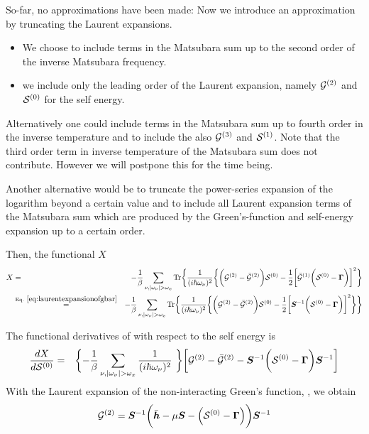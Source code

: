 \documentclass[11pt,a4paper]{report}
\begin{document}
So-far, no approximations have been made: Now we introduce an
approximation by truncating the Laurent expansions.
\begin{itemize}
\item We choose to include terms in the Matsubara sum up to the second
  order of the inverse Matsubara frequency.
\item we include only the leading order of the Laurent expansion, namely
  $\mathcal{\bm{G}}^{(2)}$ and $\mathcal{\bm{S}}^{(0)}$ for the self
  energy.
\end{itemize}

Alternatively one could include terms in the Matsubara sum up to
fourth order in the inverse temperature and to include the also
$\mathcal{\bm{G}}^{(3)}$ and $\mathcal{\bm{S}}^{(1)}$. Note that the
third order term in inverse temperature of the Matsubara sum does not
contribute. However we will postpone this for the time being.

Another alternative would be to truncate the power-series expansion of
the logarithm beyond a certain value and to include all Laurent
expansion terms of the Matsubara sum which are produced by the
Green's-function and self-energy expansion up to a certain order.

Then, the functional $X$
\begin{eqnarray}
 X&=&-\frac{1}{\beta}\sum_{\nu,|\omega_\nu|>\omega_x}\Tr\biggl\lbrace
\frac{1}{(i\hbar\omega_\nu)^2}
\biggl\lbrace
\biggl(
\mathcal{\mat{G}}^{(2)}-\bar{\mathcal{\mat{G}}}^{(2)}
\biggr)
\mathcal{\mat{S}}^{(0)}
-
\frac{1}{2}
\biggl[
\bar{\mathcal{\mat{G}}}^{(1)}
\biggl(\mathcal{\mat{S}}^{(0)}-\mat{\Gamma}\biggr)
\biggr]^2\biggr\rbrace
%
\nonumber\\
&\eqrel{eq:laurentexpansionofgbar}{=}&
-\frac{1}{\beta}\sum_{\nu,|\omega_\nu|>\omega_x}\Tr\biggl\lbrace
\frac{1}{(i\hbar\omega_\nu)^2}
\biggl\lbrace
\biggl(
\mathcal{\mat{G}}^{(2)}-\bar{\mathcal{\mat{G}}}^{(2)}
\biggr)
\mathcal{\mat{S}}^{(0)}
-
\frac{1}{2}
\biggl[
\mat{S}^{-1}
\biggl(\mathcal{\mat{S}}^{(0)}-\mat{\Gamma}\biggr)
\biggr]^2\biggr\rbrace
\biggr\rbrace
\label{eq:161forx}
\end{eqnarray}

The functional derivatives of  with respect to the self
energy is
\begin{eqnarray}
\frac{dX}{d\mathcal{\mat{S}}^{(0)}}
&=&
\biggl\lbrace
-\frac{1}{\beta}\sum_{\nu,|\omega_\nu|>\omega_x}\frac{1}{(i\hbar\omega_\nu)^2}\
\biggr\rbrace
\biggl[
\mathcal{\mat{G}}^{(2)}-\bar{\mathcal{\mat{G}}}^{(2)}
-
\mat{S}^{-1}\biggl(\mathcal{\mat{S}}^{(0)}-\mat{\Gamma}\biggr)\mat{S}^{-1}
\biggr]
\end{eqnarray}
With the Laurent expansion of the non-interacting Green's function,
\eq{eq:laurentexpansionofgbar}, we obtain
\begin{eqnarray}
\mathcal{\bm{G}}^{(2)}=\bm{S}^{-1}
\biggl(\bar{\bm{h}}-\mu\bm{S}
-\Bigl(\mathcal{\bm{S}}^{(0)}-\bm{\Gamma}\Bigr)\biggr)
\bm{S}^{-1}
\end{eqnarray}
\end{document}
